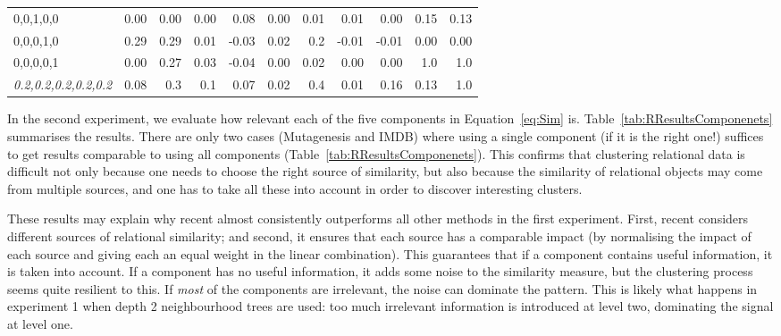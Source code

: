 \begin{table*}[t]
\begin{center}
\begin{tabular}[t]{@{}lrrrrrrrrrr@{}}
	0,0,1,0,0  &  	0.00 &  0.00  				& 0.00 & 0.08  	  		& 0.00 & 0.01      	  & 0.01 & 0.00 		& 0.15 & 0.13  \\

	0,0,0,1,0  &  	0.29 &  0.29   				& 0.01 & -0.03			& 0.02  & 0.2 	  	  & -0.01 & -0.01		& 0.00 & 0.00  \\

	0,0,0,0,1  &   0.00 & 0.27     			    & 0.03 	& -0.04			& 0.00 & 0.02  		  & 0.00 &  0.00		& 1.0 &  1.0    \\

	\textit{0.2,0.2,0.2,0.2,0.2} & 0.08 & 0.3  & 0.1	&  0.07  	    &  0.02&  0.4 		  & 0.01 & 0.16 		& 0.13 & 1.0 \\
	\bottomrule

\end{tabular}
\label{tab:RResultsComponenets}

\end{center}
\end{table*}

In the second experiment, we evaluate how relevant each of the five components in Equation~\ref{eq:Sim} is.
Table~\ref{tab:RResultsComponenets} summarises the results.
There are only two cases (Mutagenesis and IMDB) where using a single component (if it is the right one!) suffices to get results comparable to using all components (Table~\ref{tab:RResultsComponenets}).
This confirms that clustering relational data is difficult not only because one needs to choose the right source of similarity, but also because the similarity of relational objects may come from multiple sources, and one has to take all these into account in order to discover interesting clusters.




These results may explain why \gls{recent} almost consistently outperforms all other methods in the first experiment.
First, \gls{recent} considers different sources of relational similarity; and second, it ensures that each source has a comparable impact (by normalising the impact of each source and giving each an equal weight in the linear combination).
This guarantees that if a component contains useful information, it is taken into account.
If a component has no useful information, it adds some noise to the similarity measure, but the clustering process seems quite resilient to this.
If {\em most} of the components are irrelevant, the noise can dominate the pattern.
This is likely what happens in experiment 1 when depth 2 neighbourhood trees are used: too much irrelevant information is introduced at level two, dominating the signal at level one.

